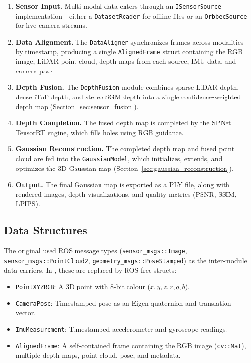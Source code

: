 \begin{enumerate}
    \item \textbf{Sensor Input.} Multi-modal data enters through an
    \texttt{ISensorSource} implementation---either a
    \texttt{DatasetReader} for offline files or an \texttt{OrbbecSource}
    for live camera streams.

    \item \textbf{Data Alignment.} The \texttt{DataAligner} synchronizes
    frames across modalities by timestamp, producing a single
    \texttt{AlignedFrame} struct containing the RGB image, LiDAR point
    cloud, depth maps from each source, IMU data, and camera pose.

    \item \textbf{Depth Fusion.} The \texttt{DepthFusion} module combines
    sparse LiDAR depth, dense iToF depth, and stereo SGM depth into a
    single confidence-weighted depth map (Section~\ref{sec:sensor_fusion}).

    \item \textbf{Depth Completion.} The fused depth map is completed by
    the SPNet TensorRT engine, which fills holes using RGB guidance.

    \item \textbf{Gaussian Reconstruction.} The completed depth map and
    fused point cloud are fed into the \texttt{GaussianModel}, which
    initializes, extends, and optimizes the 3D Gaussian map
    (Section~\ref{sec:gaussian_reconstruction}).

    \item \textbf{Output.} The final Gaussian map is exported as a PLY
    file, along with rendered images, depth visualizations, and quality
    metrics (PSNR, SSIM, LPIPS).
\end{enumerate}

\subsection{Data Structures}

The original \gaussianlic{} used ROS message types (\texttt{sensor\_msgs::Image},
\texttt{sensor\_msgs::PointCloud2}, \texttt{geometry\_msgs::PoseStamped})
as the inter-module data carriers. In \winlic, these are replaced by
ROS-free structs:

\begin{itemize}
    \item \texttt{PointXYZRGB}: A 3D point with 8-bit colour
    ($x, y, z, r, g, b$).
    \item \texttt{CameraPose}: Timestamped pose as an Eigen quaternion
    and translation vector.
    \item \texttt{ImuMeasurement}: Timestamped accelerometer and gyroscope
    readings.
    \item \texttt{AlignedFrame}: A self-contained frame containing the
    RGB image (\texttt{cv::Mat}), multiple depth maps, point cloud,
    pose, and metadata.
\end{itemize}

